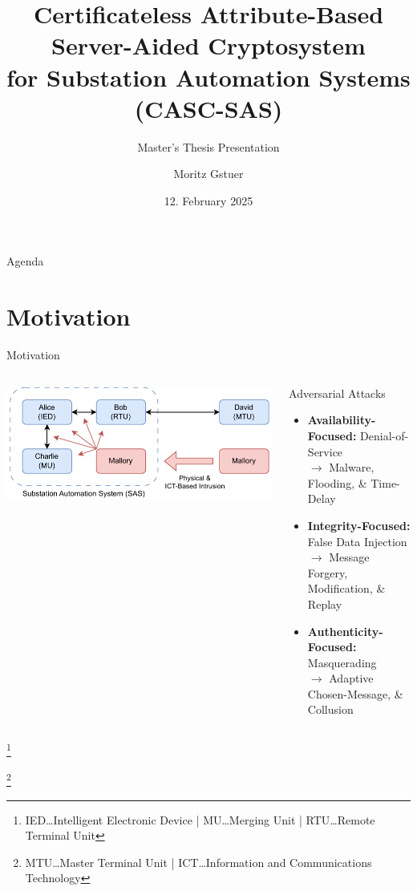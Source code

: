 \documentclass[en]{sdqbeamer}
\title[ABAC for Substations]{Certificateless Attribute-Based Server-Aided Cryptosystem\\for Substation Automation Systems (CASC-SAS)}
\subtitle{Master's Thesis Presentation}
\author[Moritz Gstuer]{Moritz Gstuer}
\date[12.\,02.\,2025]{12. February 2025}
\newcommand\nonumberfootnote[1]{%
  \begingroup
  \renewcommand\thefootnote{}\footnote{#1}%
  \addtocounter{footnote}{-1}%
  \endgroup
}
\begin{document}
 
\KITtitleframe

\begin{frame}{Agenda}
\tableofcontents
\end{frame}

\section{Motivation}
\begin{frame}{Motivation}
    \begin{columns}
        \centering
        \includegraphics[width=1.0\textwidth]{./figures/sas_intrusion.drawio.pdf}
        \begin{redblock}{Adversarial Attacks}
            \begin{itemize}
                \item \textbf{Availability-Focused:} Denial-of-Service\\$\rightarrow$ Malware, Flooding, \& Time-Delay
                \item \textbf{Integrity-Focused:} False Data Injection\\$\rightarrow$ Message Forgery, Modification, \& Replay
                \item \textbf{Authenticity-Focused:} Masquerading\\$\rightarrow$ Adaptive Chosen-Message, \& Collusion
            \end{itemize}
        \end{redblock}
    \end{columns}
    \nonumberfootnote{IED\dots Intelligent Electronic Device | MU\dots Merging Unit | RTU\dots Remote Terminal Unit}
    \nonumberfootnote{MTU\dots Master Terminal Unit | ICT\dots Information and Communications Technology}
\end{frame}
\end{document}
